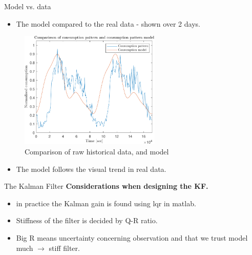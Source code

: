 \begin{frame}{Model vs. data}
	\begin{itemize}
			\item The model compared to the real data - shown over 2 days. 
	\end{itemize}
		\begin{figure}[h!]
			\centering
			\includegraphics[width=0.6\textwidth]{Topics/KalmanEstimator/Graphics/Comparisson.pdf}
			\caption{Comparison of raw historical data, and model}
			\label{fig:Comparison}
		\end{figure}
	\begin{itemize}
		\item The model follows the visual trend in real data.
	\end{itemize}	
\end{frame}


\begin{frame}{The Kalman Filter}
	\textbf{Considerations when designing the KF.}
	\begin{itemize}
		\item in practice the Kalman gain is found using lqr in matlab.
		\item Stiffness of the filter is decided by Q-R ratio.
		\item Big R means uncertainty concerning observation and that we trust model much $\rightarrow$ stiff filter.
	\end{itemize}
\end{frame}